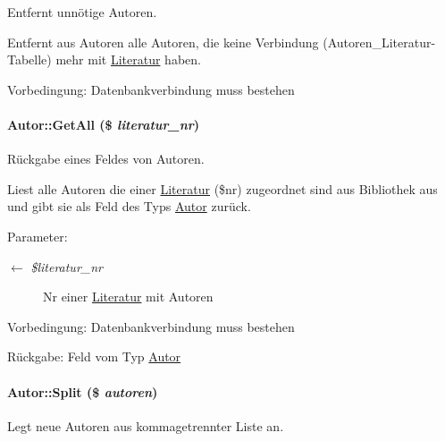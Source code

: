 Entfernt unnötige Autoren. 

Entfernt aus Autoren alle Autoren, die keine Verbindung (Autoren\_\-Literatur-Tabelle) mehr mit \hyperlink{classLiteratur}{Literatur} haben. \begin{Desc}
\item[Vorbedingung:]Datenbankverbindung muss bestehen \end{Desc}
\hypertarget{classAutor_79cd90084cab240919a5daecf39156a7}{
\paragraph[GetAll]{\setlength{\rightskip}{0pt plus 5cm}Autor::Get\-All (\$ {\em literatur\_\-nr})}\hfill}
\label{classAutor_79cd90084cab240919a5daecf39156a7}


Rückgabe eines Feldes von Autoren. 

Liest alle Autoren die einer \hyperlink{classLiteratur}{Literatur} (\$nr) zugeordnet sind aus Bibliothek aus und gibt sie als Feld des Typs \hyperlink{classAutor}{Autor} zurück. \begin{Desc}
\item[Parameter:]
\begin{description}
\item[\mbox{$\leftarrow$} {\em \$literatur\_\-nr}]Nr einer \hyperlink{classLiteratur}{Literatur} mit Autoren \end{description}
\end{Desc}
\begin{Desc}
\item[Vorbedingung:]Datenbankverbindung muss bestehen \end{Desc}
\begin{Desc}
\item[R\"{u}ckgabe:]Feld vom Typ \hyperlink{classAutor}{Autor}\end{Desc}
\hypertarget{classAutor_2ba5418b6622f414fa8a054e6c2a2db8}{
\paragraph[Split]{\setlength{\rightskip}{0pt plus 5cm}Autor::Split (\$ {\em autoren})}\hfill}
\label{classAutor_2ba5418b6622f414fa8a054e6c2a2db8}


Legt neue Autoren aus kommagetrennter Liste an. 

